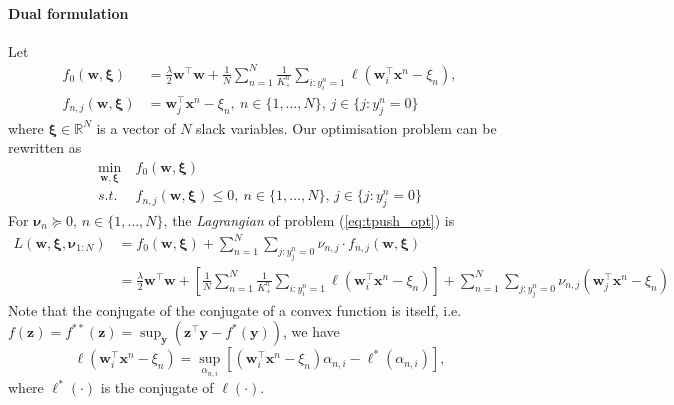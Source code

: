\documentclass[9pt]{extarticle}
\newcommand{\x}{\mathbf{x}}
\newcommand{\y}{\mathbf{y}}
\newcommand{\z}{\mathbf{z}}
\newcommand{\1}{\mathbf{1}}
\newcommand{\w}{\mathbf{w}}
\newcommand{\R}{\mathbb{R}}
\newcommand{\nubm}{\bm{\nu}}
\newcommand{\xibm}{\bm{\xi}}
\newcommand{\ie}{i.e.\ }
\begin{document}
\paragraph{Dual formulation}
Let
\begin{align*}
f_0(\w, \xibm)     &= \frac{\lambda}{2} \w^\top \w + \frac{1}{N} \sum_{n=1}^N \frac{1}{K_+^n} \sum_{i:y_i^n=1} \ell \left( \w_i^\top \x^n - \xi_n \right), \\
f_{n,j}(\w, \xibm) &= \w_j^\top \x^n - \xi_n, \ n \in \{1,\dots,N\}, \, j \in \{j: y_j^n = 0\}
\end{align*}
where $\xibm \in \R^{N}$ is a vector of $N$ slack variables.
%
Our optimisation problem can be rewritten as
\begin{equation}
\label{eq:tpush_opt}
\begin{aligned}
\min_{\w, \xibm} \ & f_0(\w, \xibm) \\
s.t.             \ & f_{n,j}(\w, \xibm) \le 0, \ n \in \{1,\dots,N\}, \, j \in \{j: y_j^n = 0\}
\end{aligned}
\end{equation}
%
For $\nubm_n \succeq 0, \, n \in \{1,\dots,N\}$, the \emph{Lagrangian} of problem (\ref{eq:tpush_opt}) is
\begin{equation}
\label{eq:tpush_lg}
\begin{aligned}
L(\w, \xibm, \nubm_{1:N}) 
&= f_0(\w, \xibm) + \sum_{n=1}^N \sum_{j:y_j^n=0} \nu_{n,j} \cdot f_{n,j}(\w, \xibm) \\
&= \frac{\lambda}{2} \w^\top \w + \left[ \frac{1}{N} \sum_{n=1}^N \frac{1}{K_+^n} \sum_{i:y_i^n=1} \ell \left( \w_i^\top \x^n - \xi_n \right) \right] +
   \sum_{n=1}^N \sum_{j:y_j^n=0} \nu_{n,j} \left( \w_j^\top \x^n - \xi_n \right)
\end{aligned}
\end{equation}
%
Note that the conjugate of the conjugate of a convex function is itself, \ie $f(\z) = f^{**}(\z) = \sup_{\y} \left( \z^\top \y - f^*(\y) \right)$, we have
\begin{equation}
\label{eq:conjugate}
\ell( \w_i^\top \x^n - \xi_n) = \sup_{\alpha_{n,i}} \left[ \left( \w_i^\top \x^n - \xi_n \right) \alpha_{n,i} - \ell^*(\alpha_{n,i}) \right],
\end{equation}
where $\ell^*(\cdot)$ is the conjugate of $\ell(\cdot)$.
\end{document}
